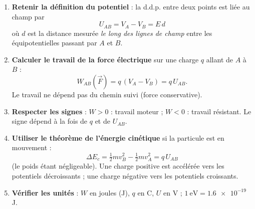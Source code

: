 \documentclass[11pt]{article}
\begin{document}
\begin{methode}
\begin{enumerate}
\item \textbf{Retenir la définition du potentiel} : la d.d.p. entre deux points est liée au champ par
\[
U_{AB} = V_A - V_B = E\,d
\]
où $d$ est la distance mesurée \emph{le long des lignes de champ} entre les équipotentielles passant par $A$ et $B$.
\item \textbf{Calculer le travail de la force électrique} sur une charge $q$ allant de $A$ à $B$ :
\[
W_{AB}(\vec{F}) = q\,(V_A - V_B) = q\,U_{AB}.
\]
Le travail ne dépend pas du chemin suivi (force conservative).
\item \textbf{Respecter les signes} : $W > 0$ : travail moteur ; $W < 0$ : travail résistant. Le signe dépend à la fois de $q$ et de $U_{AB}$.
\item \textbf{Utiliser le théorème de l'énergie cinétique} si la particule est en mouvement :
\[
\Delta E_c = \tfrac{1}{2}mv_B^2 - \tfrac{1}{2}mv_A^2 = q\,U_{AB}
\]
(le poids étant négligeable). Une charge positive est accélérée vers les potentiels décroissants ; une charge négative vers les potentiels croissants.
\item \textbf{Vérifier les unités} : $W$ en joules (J), $q$ en C, $U$ en V ; $1\ \text{eV} = \num{1,6e-19}$ J.
\end{enumerate}
\end{methode}
\end{document}

